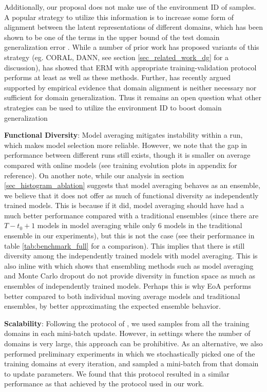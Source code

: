 Additionally, our proposal does not make use of the environment ID of samples. A popular strategy to utilize this information is to increase some form of alignment between the latent representations of different domains, which has been shown to be one of the terms in the upper bound of the test domain generalization error \cite{ben2006analysis}. While a number of prior work has proposed variants of this strategy (eg. CORAL, DANN, see section \ref{sec_related_work_dg} for a discussion), \cite{gulrajani2020search} has showed that ERM with appropriate training-validation protocol performs at least as well as these methods. Further, \cite{vedantam2021empirical} has recently argued supported by empirical evidence that domain alignment is neither necessary nor sufficient for domain generalization. Thus it remains an open question what other strategies can be used to utilize the environment ID to boost domain generalization

\textbf{Functional Diversity}: Model averaging mitigates instability within a run, which makes model selection more reliable. However, we note that the gap in performance between different runs still exists, though it is smaller on average compared with online models (see training evolution plots in appendix for reference). On another note, while our analysis in section \ref{sec_histogram_ablation} suggests that model averaging behaves as an ensemble, we believe that it does not offer as much of functional diversity as independently trained models. This is because if it did, model averaging should have had a much better performance compared with a traditional ensembles (since there are $T-t_0+1$ models in model averaging while only 6 models in the traditional ensemble in our experiments), but this is not the case (see their performance in table \ref{tab:benchmark_full} for a comparison). This implies that there is still diversity among the independently trained models with model averaging. This is also inline with \cite{fort2019deep} which shows that ensembling methods such as model averaging and Monte Carlo dropout \cite{gal2016dropout} do not provide diversity in function space as much as ensembles of independently trained models. Perhaps this is why EoA performs better compared to both individual moving average models and traditional ensembles, by better approximating the expected ensemble behavior. 

\textbf{Scalability}: Following the protocol of \cite{gulrajani2020search}, we used samples from all the training domains in each mini-batch update. However, in settings where the number of domains is very large, this approach can be prohibitive. As an alternative, we also performed preliminary experiments in which we stochastically picked one of the training domains at every iteration, and sampled a mini-batch from that domain to update parameters. We found that this protocol resulted in a similar performance as that achieved by the protocol used in our work.

